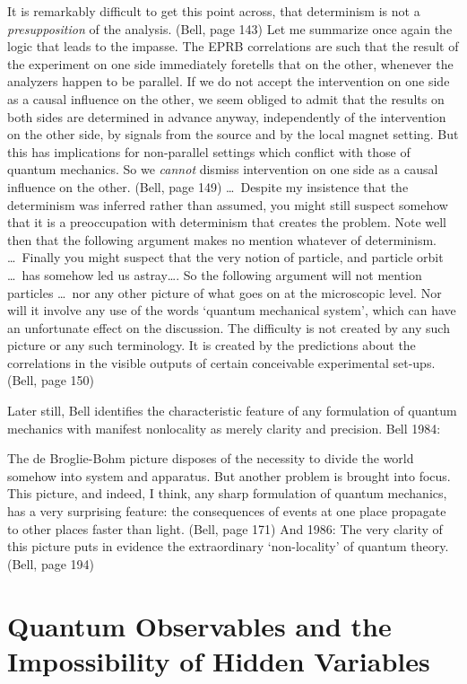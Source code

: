 It is remarkably difficult to get this point across, that determinism is
not a {\it presupposition\/} of the analysis. (Bell, page 143)
\eq
\bq Let me summarize once again the logic that leads to the impasse. The
EPRB correlations are such that the result of the experiment on one side
immediately foretells that on the other, whenever the analyzers happen to
be parallel. If we do not accept the intervention on one side as a causal
influence on the other, we seem obliged to admit that the results on both
sides are determined in advance anyway, independently of the intervention
on the other side, by signals from the source and by the local magnet
setting. But this has implications for non-parallel settings which conflict
with those of quantum mechanics. So we {\it cannot\/} dismiss intervention
on one side as a causal influence on the other. (Bell, page 149)
\eq
\bq  \dots\  Despite my insistence that the determinism was inferred
rather than assumed, you might still suspect somehow that it is a
preoccupation with determinism that creates the problem. Note well then
that the following argument makes no mention whatever of determinism. \dots\
Finally you might suspect that the very notion of particle, and particle
orbit \dots\  has somehow led us astray\dots. So the following argument
will not
mention particles \dots\  nor any other picture of what goes on at the
microscopic level. Nor will it involve any use of the words `quantum
mechanical system', which can have an unfortunate effect on the discussion.
The difficulty is not created by any such picture or any such terminology.
It is created by the predictions about the correlations in the visible
outputs of certain conceivable experimental set-ups. (Bell, page 150)
\eq

Later still,  Bell identifies the characteristic  feature of any formulation of
quantum mechanics with  manifest nonlocality  as merely
clarity and precision. Bell 1984:


\bq The de Broglie-Bohm picture disposes of the necessity to divide the
world somehow into system and apparatus. But another problem is brought
into focus. This picture, and indeed, I think, any sharp formulation of
quantum mechanics, has a very surprising feature: the consequences of
events at one place propagate to other places faster than light. (Bell,
page 171)
\eq
And 1986:
\bq The very clarity of this picture puts in evidence the extraordinary
`non-locality' of quantum theory. (Bell, page 194)
\eq

\medskip

\section*{Quantum Observables and the Impossibility of Hidden Variables}

